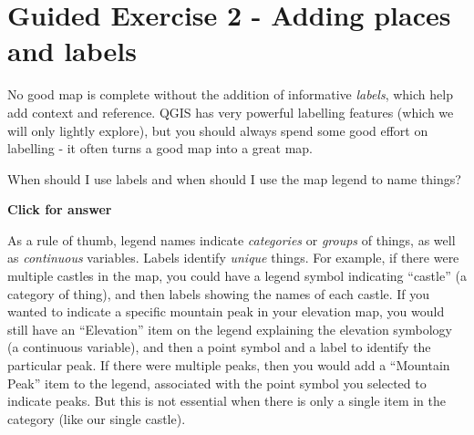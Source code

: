 \documentclass[
  letterpaper,
  DIV=11,
  numbers=noendperiod]{scrreprt}
\begin{document}
\section{Guided Exercise 2 - Adding places and
labels}\label{guided-exercise-2---adding-places-and-labels}

No good map is complete without the addition of informative
\emph{labels}, which help add context and reference. QGIS has very
powerful labelling features (which we will only lightly explore), but
you should always spend some good effort on labelling - it often turns a
good map into a great map.

\begin{tcolorbox}[enhanced jigsaw, coltitle=black, toprule=.15mm, breakable, opacitybacktitle=0.6, left=2mm, colback=white, leftrule=.75mm, rightrule=.15mm, colbacktitle=quarto-callout-important-color!10!white, toptitle=1mm, titlerule=0mm, colframe=quarto-callout-important-color-frame, arc=.35mm, bottomtitle=1mm, opacityback=0, bottomrule=.15mm, title=\textcolor{quarto-callout-important-color}{\faExclamation}\hspace{0.5em}{Stop and Think}]

When should I use labels and when should I use the map legend to name
things?

\end{tcolorbox}

\begin{tcolorbox}[enhanced jigsaw, toprule=.15mm, breakable, left=2mm, colframe=quarto-callout-important-color-frame, colback=white, arc=.35mm, leftrule=.75mm, opacityback=0, rightrule=.15mm, bottomrule=.15mm]

\vspace{-3mm}\textbf{Click for answer}\vspace{3mm}

As a rule of thumb, legend names indicate \emph{categories} or
\emph{groups} of things, as well as \emph{continuous} variables. Labels
identify \emph{unique} things. For example, if there were multiple
castles in the map, you could have a legend symbol indicating ``castle''
(a category of thing), and then labels showing the names of each castle.
If you wanted to indicate a specific mountain peak in your elevation
map, you would still have an ``Elevation'' item on the legend explaining
the elevation symbology (a continuous variable), and then a point symbol
and a label to identify the particular peak. If there were multiple
peaks, then you would add a ``Mountain Peak'' item to the legend,
associated with the point symbol you selected to indicate peaks. But
this is not essential when there is only a single item in the category
(like our single castle).

\end{tcolorbox}
\end{document}
